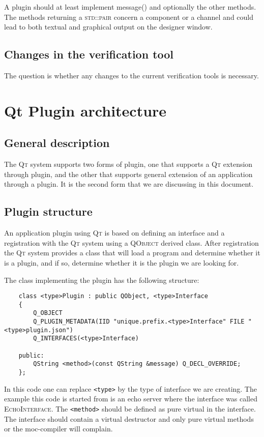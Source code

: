 \documentclass[a4paper,11pt,final]{article}
\newcommand{\qt}{\textsc{Qt}\xspace}%
\newcommand{\code}[1]{\textsc{#1}\xspace}%
\begin{document}
A plugin should at least implement message() and optionally the other methods.
The methods returning a \code{std::pair} concern a component or a
channel and could lead to both textual and graphical output on the
designer window.

\subsection{Changes in the verification tool}

The question is whether any changes to the current verification tools is necessary.

\section{Qt Plugin architecture}

\subsection{General description}

The \qt system supports two forms of plugin, one that supports a \qt extension through plugin, and
the other that supports general extension of an application through a plugin. It is the second form
that we are discussing in this document. 

\subsection{Plugin structure}

An application plugin using \qt is based on defining an interface and a registration with the \qt
system using a \code{QObject} derived class. After registration the \qt system provides a class
\code{} that will load a program and determine whether it is a plugin, and if so, determine
whether it is the plugin we are looking for.

The class implementing the plugin has the following structure:

\begin{verbatim}
	class <type>Plugin : public QObject, <type>Interface
	{
	    Q_OBJECT
	    Q_PLUGIN_METADATA(IID "unique.prefix.<type>Interface" FILE "<type>plugin.json")
	    Q_INTERFACES(<type>Interface)
	
	public:
	    QString <method>(const QString &message) Q_DECL_OVERRIDE;
	};
\end{verbatim}

In this code one can replace \verb=<type>= by the type of interface we are creating. The 
example this code is started from is an echo server where the interface was called 
\code{EchoInterface}. The \verb=<method>= should be defined as pure virtual in the interface.
The interface should contain a virtual destructor and only pure virtual methods or the
moc-compiler will complain.
\end{document}
